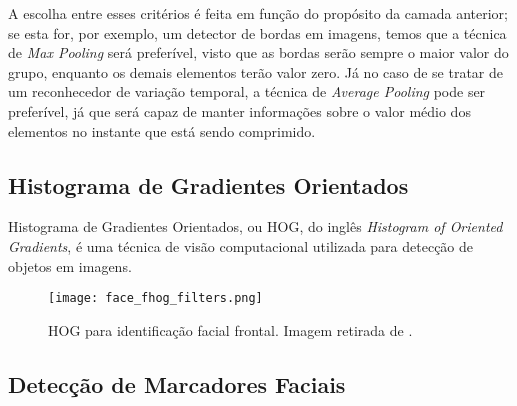 A escolha entre esses critérios é feita em função do propósito da camada anterior; se esta for, por exemplo, um detector de bordas em imagens, temos que a técnica de \textit{Max Pooling} será preferível, visto que as bordas serão sempre o maior valor do grupo, enquanto os demais elementos terão valor zero.
Já no caso de se tratar de um reconhecedor de variação temporal, a técnica de \textit{Average Pooling} pode ser preferível, já que será capaz de manter informações sobre o valor médio dos elementos no instante que está sendo comprimido.

\subsection{Histograma de Gradientes Orientados}
\label{sec:facialrecog}

Histograma de Gradientes Orientados, ou HOG, do inglês \textit{Histogram of Oriented Gradients}, é uma técnica de visão computacional utilizada para detecção de objetos em imagens.

\begin{figure}[ht]
    \centering
    \texttt{[image: face\_fhog\_filters.png]}
    \caption{HOG para identificação facial frontal. Imagem retirada de \cite{kingDlib18Released}.}
    \label{fig:dlib_hog}
\end{figure}

\subsection{Detecção de Marcadores Faciais}
\label{sec:faciallm}